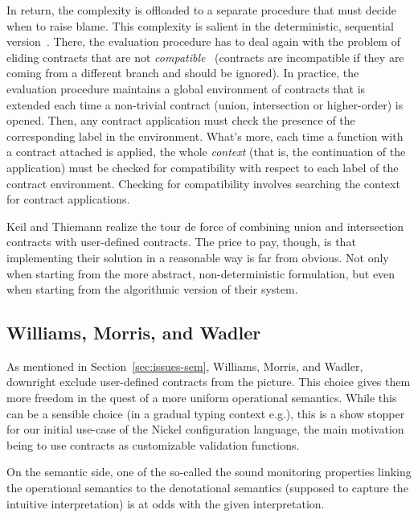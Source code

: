 \documentclass[sigplan,10pt,review,anonymous]{acmart}
\newcommand{\unsure}[2][1=]{}
\begin{document}
In return, the complexity is offloaded to a separate procedure that must decide
when to raise blame. This complexity is salient in the deterministic, sequential
version~\cite[Section 5.1]{KeilThiemannUnionIntersection}. There,
the evaluation procedure has to deal again with the problem of eliding contracts
that are not \emph{compatible}~\cite[Section 5.1]{KeilThiemannUnionIntersection} (contracts are incompatible
if they are coming from a different branch and should be ignored). In practice,
the evaluation procedure maintains a global environment of contracts that is
extended each time a non-trivial contract (union, intersection or higher-order)
is opened. Then, any contract application must check the presence of the
corresponding label in the environment. What's more, each time a function with a contract attached is applied,
the whole \emph{context} (that is, the continuation of the application)
must be checked for compatibility with respect to each label of the contract
environment. Checking for compatibility involves searching the context for
contract applications.

Keil and Thiemann realize the tour de force of combining union and intersection
contracts with user-defined contracts. The price to pay, though, is that
implementing their solution in a reasonable way is far from obvious. Not only
when starting from the more abstract, non-deterministic formulation, but even
when starting from the algorithmic version of their system.

\subsection{Williams, Morris, and Wadler}
\label{sec:will-morr-wadl}
\unsure{Subsection title?}

As mentioned in Section~\ref{sec:issues-sem}, Williams, Morris, and Wadler,
downright exclude user-defined contracts from the picture. This choice gives
them more freedom in the quest of a more uniform operational semantics. While
this can be a sensible choice (in a gradual typing context e.g.), this is a show
stopper for our initial use-case of the Nickel configuration language, the main
motivation being to use contracts as customizable validation functions.

On the semantic side, one of the so-called the sound monitoring properties
linking the operational semantics to the denotational semantics (supposed to
capture the intuitive interpretation) is at odds with the given interpretation.
\end{document}
